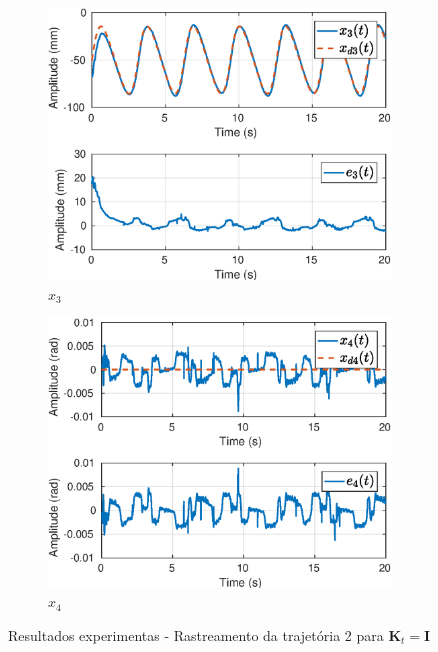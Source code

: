 \begin{figure}[H]
\begin{subfigure}{.5\textwidth}
  \includegraphics[width=\linewidth]{./img/traj_2_k1/x3.eps}
  \caption{$x_3$}
  \label{fig:sub1}
\end{subfigure}%
\begin{subfigure}{.5\textwidth}
  \centering
  \includegraphics[width=\linewidth]{./img/traj_2_k1/x4.eps}
  \caption{$x_4$}
  \label{fig:sub2}
\end{subfigure}
\caption{Resultados experimentas - Rastreamento da trajetória 2 para $\bm{K}_t = \bm{I}$}
\label{fig:test}
\end{figure}

